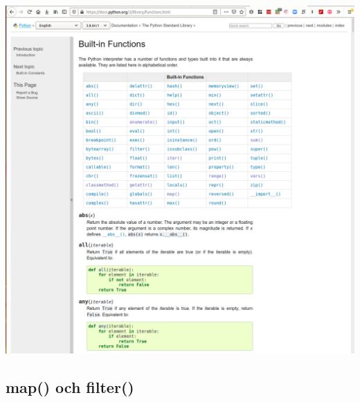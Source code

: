 \begin{frame}
  \includegraphics[width=\columnwidth]{figs/docs-built-in.png}
\end{frame}

\subsection{map() och filter()}

\begin{frame}[fragile]
  \begin{example}
    \inputminted[firstline=3,lastline=15]{python}{examples/mapping.py}
  \end{example}
\end{frame}

\begin{frame}[fragile]
  \begin{example}
    \inputminted[firstline=16]{python}{examples/mapping.py}
  \end{example}
\end{frame}

\begin{frame}[fragile]
  \begin{example}
    \inputminted[firstline=3,lastline=15]{python}{examples/filtering.py}
  \end{example}
\end{frame}

